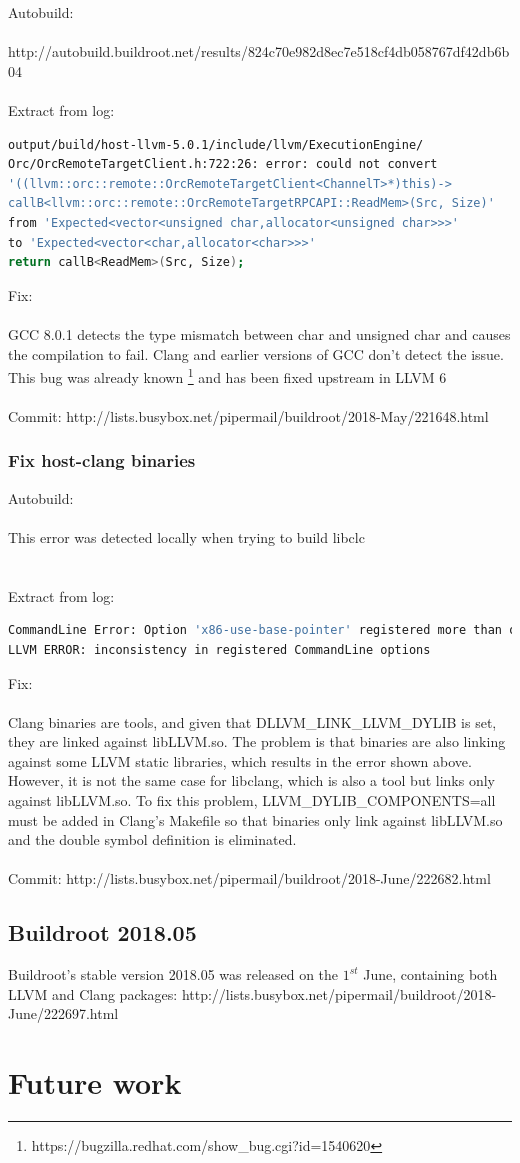 \documentclass[12pt,a4paper,oneside]{article}
\begin{document}
Autobuild:\\\\
http://autobuild.buildroot.net/results/824c70e982d8ec7e518cf4db058767df42db6b04\\\\
Extract from log:
\begin{lstlisting}[language=sh,keywords={}]
output/build/host-llvm-5.0.1/include/llvm/ExecutionEngine/
Orc/OrcRemoteTargetClient.h:722:26: error: could not convert
'((llvm::orc::remote::OrcRemoteTargetClient<ChannelT>*)this)->
callB<llvm::orc::remote::OrcRemoteTargetRPCAPI::ReadMem>(Src, Size)'
from 'Expected<vector<unsigned char,allocator<unsigned char>>>'
to 'Expected<vector<char,allocator<char>>>'
return callB<ReadMem>(Src, Size);
\end{lstlisting}
Fix:\\\\
GCC 8.0.1 detects the type mismatch between char and unsigned char and causes the
compilation to fail. Clang and earlier versions of GCC don't detect the issue.
This bug was already known
\footnote{https://bugzilla.redhat.com/show\_bug.cgi?id=1540620} and has been
fixed upstream in LLVM 6\\\\
Commit: http://lists.busybox.net/pipermail/buildroot/2018-May/221648.html
\subsubsection*{Fix host-clang binaries}
Autobuild:\\\\
This error was detected locally when trying to build libclc\\\\\\
Extract from log:
\begin{lstlisting}[language=sh,keywords={}]
CommandLine Error: Option 'x86-use-base-pointer' registered more than once!
LLVM ERROR: inconsistency in registered CommandLine options
\end{lstlisting}
Fix:\\\\
Clang binaries are tools, and given that DLLVM\_LINK\_LLVM\_DYLIB is set,
they are linked against libLLVM.so. The problem is that binaries are
also linking against some LLVM static libraries, which results in the error
shown above. However, it is not the same case for libclang, which is also
a tool but links only against libLLVM.so. To fix this problem,
LLVM\_DYLIB\_COMPONENTS=all must be added in Clang's Makefile so that binaries
only link against libLLVM.so and the double symbol definition is eliminated.
\\\\
Commit: http://lists.busybox.net/pipermail/buildroot/2018-June/222682.html

\subsection*{Buildroot 2018.05}

Buildroot's stable version 2018.05 was released on the $1^{st}$ June, containing
both LLVM and Clang packages:
http://lists.busybox.net/pipermail/buildroot/2018-June/222697.html

\newpage
\section{Future work}
\end{document}
